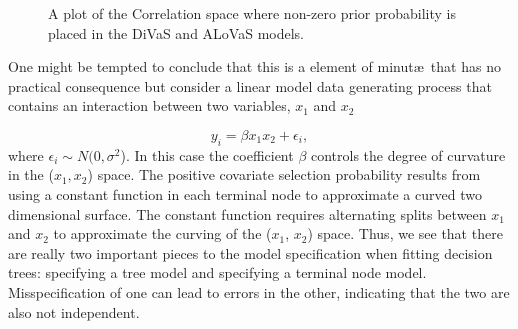 \begin{figure}[H]
\begin{center}
\end{center}
\caption{A plot of the Correlation space where non-zero prior probability is placed in the DiVaS and ALoVaS models.}
\label{fig:corr_divas_alovas}
\end{figure}



One might be tempted to conclude that this is a element of minut\ae\ that has no practical consequence but consider a linear model data generating process that contains an interaction between two variables, $x_1$ and $x_2$

\begin{equation}\label{eqn:interaction_model}
y_i = \beta x_1x_2 + \epsilon_i,
\end{equation}  
where $\epsilon_i \sim N(0, \sigma^2$). In this case the coefficient $\beta$ controls the degree of curvature in the ($x_1, x_2$) space. The positive covariate selection probability results from using a constant function in each terminal node to approximate a curved two dimensional surface. The constant function requires alternating splits between $x_1$ and $x_2$ to approximate the curving of the ($x_1$, $x_2$) space. Thus, we see that there are really two important pieces to the model specification when fitting decision trees: specifying a tree model and specifying a terminal node model. Misspecification of one can lead to errors in the other, indicating that the two are also not independent.

